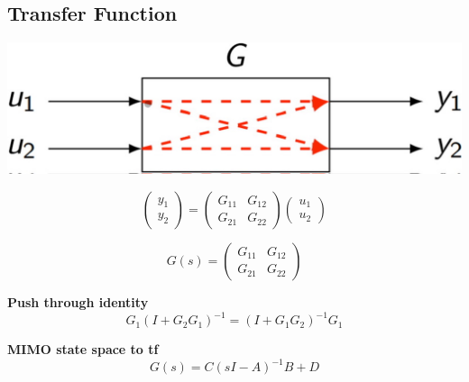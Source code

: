 \subsection{Transfer Function}
\centerline{\includegraphics[width=0.5\linewidth]{src/6_mimo/images/transfer_function.jpeg}}

\begin{minipage}{0.55\linewidth}
    \vspace{1pt}
    \begin{equation*}
        \begin{pmatrix}
            y_1 \\
            y_2
        \end{pmatrix} =
        \begin{pmatrix}
            G_{11} & G_{12} \\
            G_{21} & G_{22}
        \end{pmatrix}
        \begin{pmatrix}
            u_1 \\
            u_2
        \end{pmatrix}
    \end{equation*} 
\end{minipage}
\begin{minipage}{0.44\linewidth}
    \begin{equation*}
        G(s) = \begin{pmatrix}
            G_{11} & G_{12} \\
            G_{21} & G_{22}
        \end{pmatrix}
    \end{equation*}
\end{minipage}
\vspace*{0.5em}

\textbf{Push through identity}
\vspace*{-0.5em}
$$
    G_1(I + G_2 G_1)^{-1} = (I + G_1 G_2)^{-1} G_1
$$

\textbf{MIMO state space to tf}
\vspace*{-0.5em}
$$
    G(s) = C(sI - A)^{-1}B + D
$$